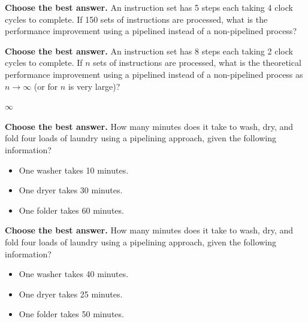 \documentclass{exam}
\begin{document}
\begin{questions}
\begin{solution}
		\end{solution}

\question \textbf{Choose the best answer.}
        An instruction set has 5 steps each taking 4 clock cycles to complete. 
        If 150 sets of instructions are processed, what is the performance improvement using a pipelined instead of a non-pipelined process? 
        
		\begin{choices}
		\end{choices}%

\question \textbf{Choose the best answer.}
        An instruction set has 8 steps each taking 2 clock cycles to complete. 
        If $n$ sets of instructions are processed, what is the theoretical performance improvement using 
        a pipelined instead of a non-pipelined process as $n\rightarrow \infty$ (or for $n$ is very large)? 
        
		\begin{choices}
			\CorrectChoice 8
			\choice $\infty$
			\choice 4.0
			\choice 16
			\choice 2
		\end{choices}%

\question \textbf{Choose the best answer.}
        How many minutes does it take to wash, dry, and fold four loads of laundry using a pipelining approach, given the following information?
        \begin{itemize}
            \item[] One washer takes 10 minutes.
            \item[] One dryer takes 30 minutes.
            \item[] One folder takes 60 minutes.
        \end{itemize}
        
		\begin{choices}
			\CorrectChoice 280
			0
			\choice 400
			\choice 340
			20
		\end{choices}%

\question \textbf{Choose the best answer.}
        How many minutes does it take to wash, dry, and fold four loads of laundry using a pipelining approach, given the following information?
        \begin{itemize}
            \item[] One washer takes 40 minutes.
            \item[] One dryer takes 25 minutes.
            \item[] One folder takes 50 minutes.
        \end{itemize}
        

\end{questions}
\end{document}
